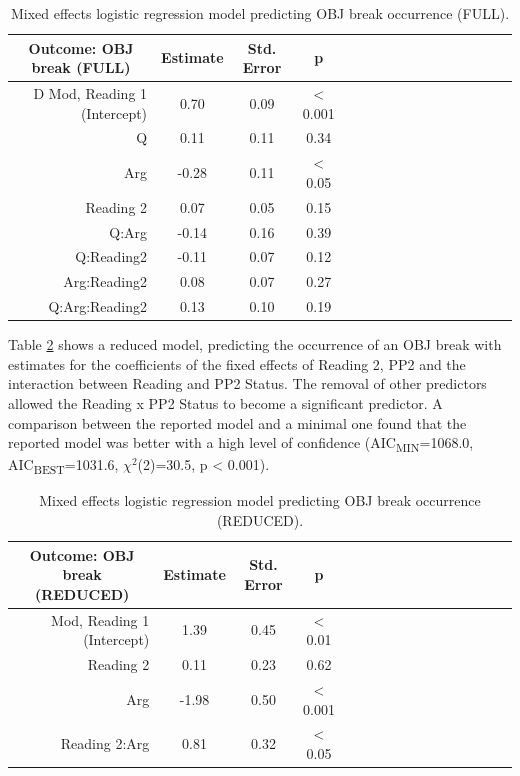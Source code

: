 \documentclass[12pt,oneside]{book}
\begin{document}
\begin{table}[!h]

\caption{\label{tab:fullobjmod}Mixed effects logistic regression model predicting OBJ break occurrence (FULL).}
\centering
\begin{tabular}{rcccrcccrcccrccc}
\toprule
\multicolumn{1}{c}{Outcome: OBJ break (FULL)} & \multicolumn{1}{c}{Estimate} & \multicolumn{1}{c}{Std. Error} & \multicolumn{1}{c}{p}\\
\midrule
D Mod, Reading 1 (Intercept) & 0.70 & 0.09 & < 0.001\\
Q & 0.11 & 0.11 & 0.34\\
Arg & -0.28 & 0.11 & < 0.05\\
Reading 2 & 0.07 & 0.05 & 0.15\\
Q:Arg & -0.14 & 0.16 & 0.39\\
\addlinespace
Q:Reading2 & -0.11 & 0.07 & 0.12\\
Arg:Reading2 & 0.08 & 0.07 & 0.27\\
Q:Arg:Reading2 & 0.13 & 0.10 & 0.19\\
\bottomrule
\end{tabular}
\end{table}

Table \ref{tab:objMod} shows a reduced model, predicting the occurrence of an OBJ break with estimates for the coefficients of the fixed effects of Reading 2, PP2 and the interaction between Reading and PP2 Status. The removal of other predictors allowed the Reading x PP2 Status to become a significant predictor. A comparison between the reported model and a minimal one found that the reported model was better with a high level of confidence (AIC\textsubscript{MIN}=1068.0, AIC\textsubscript{BEST}=1031.6, \(\chi^2\)(2)=30.5, p \textless{} 0.001).

\begin{table}[!h]

\caption{\label{tab:objMod}Mixed effects logistic regression model predicting OBJ break occurrence (REDUCED).}
\centering
\begin{tabular}{rcccrcccrcccrccc}
\toprule
\multicolumn{1}{c}{Outcome: OBJ break (REDUCED)} & \multicolumn{1}{c}{Estimate} & \multicolumn{1}{c}{Std. Error} & \multicolumn{1}{c}{p}\\
\midrule
Mod, Reading 1 (Intercept) & 1.39 & 0.45 & < 0.01\\
Reading 2 & 0.11 & 0.23 & 0.62\\
Arg & -1.98 & 0.50 & < 0.001\\
Reading 2:Arg & 0.81 & 0.32 & < 0.05\\
\bottomrule
\end{tabular}
\end{table}
\end{document}
